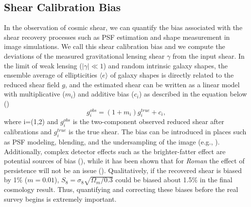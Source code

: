 \documentclass[fleqn,usenatbib]{mnras}
\begin{document}
\subsection{Shear Calibration Bias}
In the observation of cosmic shear, we can quantify the bias associated with the shear recovery processes such as PSF estimation and shape measurement in image simulations. We call this shear calibration bias and we compute the deviations of the measured gravitational lensing shear $\gamma$ from the input shear. In the limit of weak lensing ($\lvert\gamma\rvert\ll1$) and random intrinsic galaxy shapes, the ensemble average of ellipticities $\langle e \rangle$ of galaxy shapes is directly related to the reduced shear field $g$, and the estimated shear can be written as a linear model with multiplicative ($m_{i}$) and additive bias ($c_{i}$) as described in the equation below (\citealt{2006MNRAS.368.1323H, 2006MNRAS.366..101H, 2007MNRAS.376...13M}) 
\begin{equation}
    g^{obs}_{i} = (1+m_{i})g^{true}_{i} + c_{i}, 
    \label{eqn:linear}
\end{equation}
where i=(1,2) and $g^{obs}_{i}$ is the two-component observed reduced shear after calibrations and $g^{true}_{i}$ is the true shear. The bias can be introduced in places such as PSF modeling, blending, and the undersampling of the image (e.g., \citealt{2018ARA&A..56..393M}). Additionally, complex detector effects such as the brighter-fatter effect are potential sources of bias (\citealt{2013MNRAS.429..661M}), while it has been shown that for \emph{Roman} the effect of persistence will not be an issue (\citealt{2021arXiv210610273L}). Qualitatively, if the recovered shear is biased by 1$\%$ ($m=0.01$), $S_{8} = \sigma_{8} \sqrt{\Omega_{m}/0.3}$ could be biased about 1.5$\%$ in the final cosmology result. Thus, quantifying and correcting these biases before the real survey begins is extremely important. 
\end{document}
